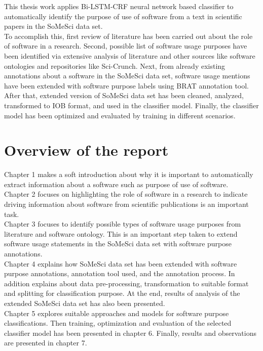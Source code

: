 This thesis work applies \ac{Bi-LSTM-CRF} neural network based classifier to automatically identify the purpose of use of software from a text in scientific papers in the \ac{SoMeSci} data set. \\

To accomplish this, first review of literature has been carried out about the role of software in a research. Second, possible list of software usage purposes have been identified via extensive analysis of literature and other sources like software ontologies and repositories like Sci-Crunch. Next, from already existing annotations about a software in the \ac{SoMeSci} data set, software usage mentions have been extended with software purpose labels using  BRAT annotation tool. After that, extended version of \ac{SoMeSci} data set has been cleaned, analyzed, transformed to \ac{IOB} format, and used in the classifier model. Finally, the classifier model has been optimized and evaluated by training in different scenarios. 


%
%
\section{ Overview of the report }
\label{sec:intro:Overview}
\noindent Chapter 1 makes a soft introduction about why it is important to automatically extract information about a software such as purpose of use of software.  \\

\noindent Chapter 2 focuses on highlighting the role of software in a research to indicate driving information about software from scientific publications is an important task.  \\

\noindent Chapter 3 focuses to identify possible types of software usage purposes from literature and software ontology. This is an important step taken to extend software usage statements in the \ac{SoMeSci} data set with software purpose annotations.  \\

\noindent Chapter 4  explains how \ac{SoMeSci} data set has been extended with software purpose annotations, annotation tool used, and the annotation process. In addition explains about data pre-processing, transformation to suitable format and splitting for classification purpose. At the end, results of analysis of the extended SoMeSci data set has also been presented.  \\


\noindent Chapter 5 explores suitable approaches and models for software purpose classifications.  Then training, optimization and evaluation of the selected classifier model has been presented in chapter 6. Finally, results and observations are presented in chapter 7.  \\



